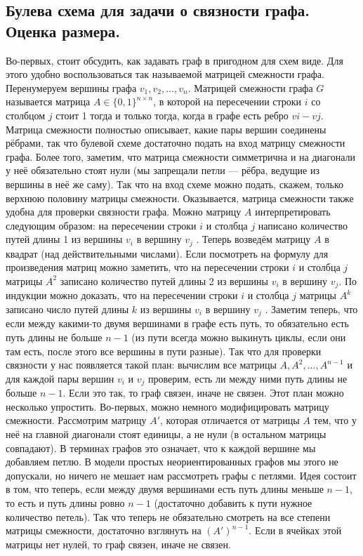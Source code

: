 \documentclass{article}
\begin{document}
\subsection{Булева схема для задачи о связности графа. Оценка размера.}
Во-первых, стоит обсудить, как задавать граф в пригодном для схем виде. Для этого удобно воспользоваться так называемой матрицей смежности графа. Перенумеруем вершины графа $v_1, v_2, ... , v_n$. Матрицей смежности графа $G$ называется матрица $A \in \{0,1\}^{n \times n}$, в которой на пересечении строки $i$ со столбцом $j$ стоит 1 тогда и только тогда, когда в графе есть ребро $vi - vj$.
\newline
Матрица смежности полностью описывает, какие пары вершин соединены рёбрами, так что булевой схеме достаточно подать на вход матрицу смежности графа. Более того, заметим, что матрица смежности симметрична и на диагонали у неё обязательно стоят нули (мы запрещали петли — рёбра, ведущие из вершины в неё же саму). Так что на вход схеме можно подать, скажем, только верхнюю половину матрицы смежности.
\newline
Оказывается, матрица смежности также удобна для проверки связности графа. Можно матрицу $A$ интерпретировать следующим образом: на пересечении строки $i$ и столбца $j$ написано количество путей длины 1 из вершины $v_i$ в вершину $v_j$ . Теперь возведём матрицу $A$ в квадрат (над действительными числами). Если посмотреть на формулу для произведения матриц можно заметить, что на пересечении строки $i$ и столбца $j$ матрицы $A^2$ записано количество путей длины 2 из вершины $v_i$ в вершину $v_j$. По индукции можно доказать, что на пересечении строки $i$ и столбца $j$ матрицы $A^k$ записано число путей длины $k$ из вершины $v_i$ в вершину $v_j$ . Заметим теперь, что если между какими-то двумя вершинами в графе есть путь, то обязательно есть путь длины не больше $n - 1$ (из пути всегда можно выкинуть циклы, если они там есть, после этого все вершины в пути разные). Так что для проверки связности у нас появляется такой план: вычислим все матрицы $A,A^2,...,A^{n-1}$ и для каждой пары вершин $v_i$ и $v_j$ проверим, есть ли между ними путь длины не больше $n - 1$. Если это так, то граф связен, иначе не связен.
\newline
Этот план можно несколько упростить. Во-первых, можно немного модифицировать матрицу смежности. Рассмотрим матрицу $A'$, которая отличается от матрицы $A$ тем, что у неё на главной диагонали стоят единицы, а не нули (в остальном матрицы совпадают). В терминах графов это означает, что к каждой вершине мы добавляем петлю. В модели простых неориентированных графов мы этого не допускали, но ничего не мешает нам рассмотреть графы с петлями. Идея состоит в том, что теперь, если между двумя вершинами есть путь длины меньше $n-1$, то есть и путь длины ровно $n - 1$ (достаточно добавить к пути нужное количество петель). Так что теперь не обязательно смотреть на все степени матрицы смежности, достаточно взглянуть на $(A')^{n-1}$. Если в ячейках этой матрицы нет нулей, то граф связен, иначе не связен.
\end{document}

